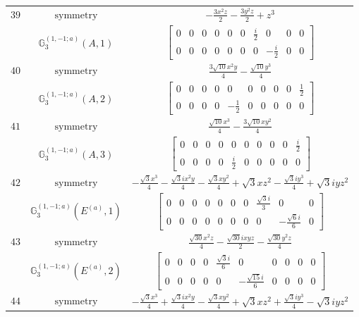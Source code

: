 \documentclass[fleqn,8pt,landscape]{jsarticle}
\begin{document}
\begin{longtable}{ccc}
$ 39 $ & $ \text{symmetry} $ & $ - \frac{3 x^{2} z}{2} - \frac{3 y^{2} z}{2} + z^{3} $ \\
$  $ & $ \mathbb{G}_{3}^{(1,-1;a)}(A,1) $ & $ \begin{bmatrix} 0 & 0 & 0 & 0 & 0 & 0 & \frac{i}{2} & 0 & 0 & 0 \\ 0 & 0 & 0 & 0 & 0 & 0 & 0 & - \frac{i}{2} & 0 & 0 \end{bmatrix} $ \\ \hline
$ 40 $ & $ \text{symmetry} $ & $ \frac{3 \sqrt{10} x^{2} y}{4} - \frac{\sqrt{10} y^{3}}{4} $ \\
$  $ & $ \mathbb{G}_{3}^{(1,-1;a)}(A,2) $ & $ \begin{bmatrix} 0 & 0 & 0 & 0 & 0 & 0 & 0 & 0 & 0 & \frac{1}{2} \\ 0 & 0 & 0 & 0 & - \frac{1}{2} & 0 & 0 & 0 & 0 & 0 \end{bmatrix} $ \\ \hline
$ 41 $ & $ \text{symmetry} $ & $ \frac{\sqrt{10} x^{3}}{4} - \frac{3 \sqrt{10} x y^{2}}{4} $ \\
$  $ & $ \mathbb{G}_{3}^{(1,-1;a)}(A,3) $ & $ \begin{bmatrix} 0 & 0 & 0 & 0 & 0 & 0 & 0 & 0 & 0 & \frac{i}{2} \\ 0 & 0 & 0 & 0 & \frac{i}{2} & 0 & 0 & 0 & 0 & 0 \end{bmatrix} $ \\ \hline
$ 42 $ & $ \text{symmetry} $ & $ - \frac{\sqrt{3} x^{3}}{4} - \frac{\sqrt{3} i x^{2} y}{4} - \frac{\sqrt{3} x y^{2}}{4} + \sqrt{3} x z^{2} - \frac{\sqrt{3} i y^{3}}{4} + \sqrt{3} i y z^{2} $ \\
$  $ & $ \mathbb{G}_{3}^{(1,-1;a)}(E^{(a)},1) $ & $ \begin{bmatrix} 0 & 0 & 0 & 0 & 0 & 0 & 0 & \frac{\sqrt{3} i}{3} & 0 & 0 \\ 0 & 0 & 0 & 0 & 0 & 0 & 0 & 0 & - \frac{\sqrt{6} i}{6} & 0 \end{bmatrix} $ \\ \hline
$ 43 $ & $ \text{symmetry} $ & $ \frac{\sqrt{30} x^{2} z}{4} - \frac{\sqrt{30} i x y z}{2} - \frac{\sqrt{30} y^{2} z}{4} $ \\
$  $ & $ \mathbb{G}_{3}^{(1,-1;a)}(E^{(a)},2) $ & $ \begin{bmatrix} 0 & 0 & 0 & 0 & \frac{\sqrt{3} i}{6} & 0 & 0 & 0 & 0 & 0 \\ 0 & 0 & 0 & 0 & 0 & - \frac{\sqrt{15} i}{6} & 0 & 0 & 0 & 0 \end{bmatrix} $ \\ \hline
$ 44 $ & $ \text{symmetry} $ & $ - \frac{\sqrt{3} x^{3}}{4} + \frac{\sqrt{3} i x^{2} y}{4} - \frac{\sqrt{3} x y^{2}}{4} + \sqrt{3} x z^{2} + \frac{\sqrt{3} i y^{3}}{4} - \sqrt{3} i y z^{2} $ \\

\end{longtable}
\end{document}
